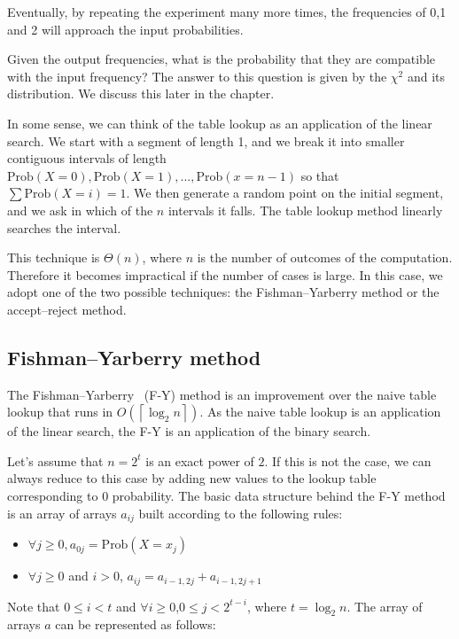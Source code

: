 \documentclass[justified,sixbynine]{tufte-book}
\theoremstyle{plain}%
\theoremstyle{definition}
\theoremstyle{remark}
\begin{document}
\begin{fullwidth}
Eventually, by repeating the experiment many more times, the frequencies of
0,1 and 2 will approach the input probabilities.

Given the output frequencies, what is the probability that they are compatible with the input frequency?
The answer to this question is given by the $\chi^2$ and its distribution. We discuss this later in the chapter.

In some sense, we can think of the table lookup as an application of the
linear search. We start with a segment of length 1, and we break it into smaller
contiguous intervals of length $\textrm{Prob}(X=0),\textrm{Prob}(X=1),...,\textrm{Prob}(x=n-1)$ so that $\sum
\textrm{Prob}(X=i)=1.$ We then generate a random point on the initial segment, and we ask
in which of the $n$ intervals it falls. The table lookup method linearly
searches the interval.

This technique is $\Theta (n)$, where $n$ is the number of outcomes of the
computation. Therefore it becomes impractical if the number of cases is
large. In this case, we adopt one of the two possible techniques: the
Fishman--Yarberry method or the accept--reject method.

\goodbreak\subsection{Fishman--Yarberry method}

The Fishman--Yarberry~\cite{fishman}  (F-Y) method is an improvement over the naive table
lookup that runs in $O(\left\lceil \log _2n\right\rceil )$. As the naive
table lookup is an application of the linear search, the F-Y is an
application of the binary search.

Let's assume that $n=2^t$ is an exact power of $2$. If this is not the case,
we can always reduce to this case by adding new values to the lookup table
corresponding to $0$ probability. The basic data structure behind the F-Y
method is an array of arrays $a_{ij}$ built according to the following rules:

\begin{itemize}
\item  $\forall j\geq 0,a_{0j}=\textrm{Prob}(X=x_j)$

\item  $\forall j\geq 0$ and $i>0$, $a_{ij}=a_{i-1,2j}+a_{i-1,2j+1}$
\end{itemize}

Note that $0\leq i<t$ and $\forall i\geq 0$,$0\leq j<2^{t-i}$, where $t=\log
_2n$. The array of arrays $a$ can be represented as follows:


\end{fullwidth}
\end{document}
